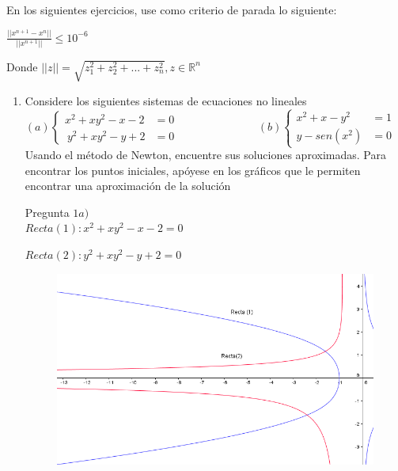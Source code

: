 \documentclass{udparticle}
\begin{document}
        
        En los siguientes ejercicios, use como criterio de parada lo siguiente:
        \begin{center}
            $ \frac{|| x^{n+1} - x^{n} ||}{|| x^{n+1} ||} \leq 10^{-6} $  
        \end{center}

        Donde $||z||=\sqrt{z_{1}^{2} + z_{2}^2+...+z_{n}^{2}} , z \in \mathbb{R}^{n}$
    \begin{enumerate}   
        
        \item Considere los siguientes sistemas de ecuaciones no lineales\\
        
        \begin{math}
            (a)\left\lbrace
          \begin{array}{ll}
                x^2 + xy^2-x-2&=0 \\\
                y^2 + xy^2-y+2&=0
            \end{array}
            \right.
            \hspace{3cm}
            (b) \left\lbrace
           \begin{array}{ll}
                 x^2+x-y^2&=1  \\
                 y-sen(x^2)&=0 
            \end{array}
            \right.
        \end{math}\\
        
        Usando el método de Newton, encuentre sus soluciones aproximadas. Para encontrar los puntos iniciales, apóyese en los gráficos que le permiten encontrar una aproximación de la solución 
        
        
        Pregunta $ 1a) $\\
        
            
            $ Recta(1) : x^2+xy^2-x-2=0 $
            
            $ Recta(2) : y^2 +xy^2-y+2=0 $
            
            \begin{figure}[h]
                \centering
                \includegraphics[width=15cm]{GraficoEcEj1a}
            \end{figure}
            

\end{enumerate}
\end{document}
